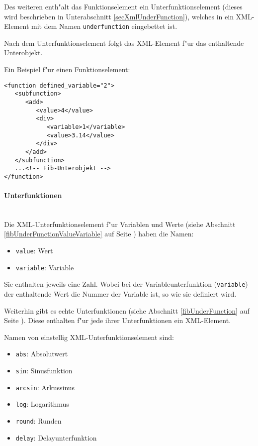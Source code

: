 Des weiteren enth"alt das Funktionselement ein Unterfunktionselement (dieses wird beschrieben in Unterabschnitt \ref{secXmlUnderFunction}), welches in ein XML-Element mit dem Namen \verb|underfunction| eingebettet ist.

Nach dem Unterfunktionselement folgt das XML-Element f"ur das enthaltende Unterobjekt.

\bigskip\noindent
Ein Beispiel f"ur einen Funktionselement:
\begin{verbatim}
<function defined_variable="2">
   <subfunction>
      <add>
         <value>4</value>
         <div>
            <variable>1</variable>
            <value>3.14</value>
         </div>
      </add>
   </subfunction>
   ...<!-- Fib-Unterobjekt -->
</function>
\end{verbatim}


\paragraph{Unterfunktionen}
\label{secXmlUnderFunction}

\ \\
Die XML-Unterfunktionselement f"ur Variablen und Werte (siehe Abschnitt \ref{fibUnderFunctionValueVariable} auf Seite \pageref{fibUnderFunctionValueVariable}) haben die Namen:
\begin{itemize}
 \item \verb|value|: Wert
 \item \verb|variable|: Variable
\end{itemize}
Sie enthalten jeweils eine Zahl.
Wobei bei der Variableunterfunktion (\verb|variable|) der enthaltende Wert die Nummer der Variable ist, so wie sie definiert wird.

\bigskip\noindent
Weiterhin gibt es echte Unterfunktionen (siehe Abschnitt \ref{fibUnderFunction} auf Seite \pageref{fibUnderFunction}). Diese enthalten f"ur jede ihrer Unterfunktionen ein XML-Element.

\bigskip\noindent
Namen von einstellig XML-Unterfunktionselement sind:
\begin{itemize}
 \item \verb|abs|: Absolutwert
 \item \verb|sin|: Sinusfunktion
 \item \verb|arcsin|: Arkussinus
 \item \verb|log|: Logarithmus
 \item \verb|round|: Runden
 \item \verb|delay|: Delayunterfunktion
\end{itemize}

